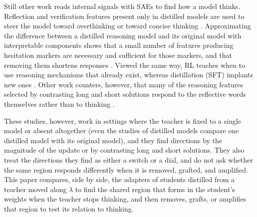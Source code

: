 Still other work reads internal signals with SAEs to find how a model thinks. Reflection and verification features present only in distilled models are used to steer the model toward overthinking or toward concise thinking \citep{baek2025distilled}. Approximating the difference between a distilled reasoning model and its original model with interpretable components shows that a small number of features producing hesitation markers are necessary and sufficient for those markers, and that removing them shortens responses \citep{hu2026transcoder}. Viewed the same way, RL teaches when to use reasoning mechanisms that already exist, whereas distillation (SFT) implants new ones \citep{venhoff2026base}. Other work counters, however, that many of the reasoning features selected by contrasting long and short solutions respond to the reflective words themselves rather than to thinking \citep{ma2026sae}.

These studies, however, work in settings where the teacher is fixed to a single model or absent altogether (even the studies of distilled models compare one distilled model with its original model), and they find directions by the magnitude of the update or by contrasting long and short solutions. They also treat the directions they find as either a switch or a dial, and do not ask whether the same region responds differently when it is removed, grafted, and amplified. This paper compares, side by side, the adapters of students distilled from a teacher moved along $\lambda$ to find the shared region that forms in the student's weights when the teacher stops thinking, and then removes, grafts, or amplifies that region to test its relation to thinking.

